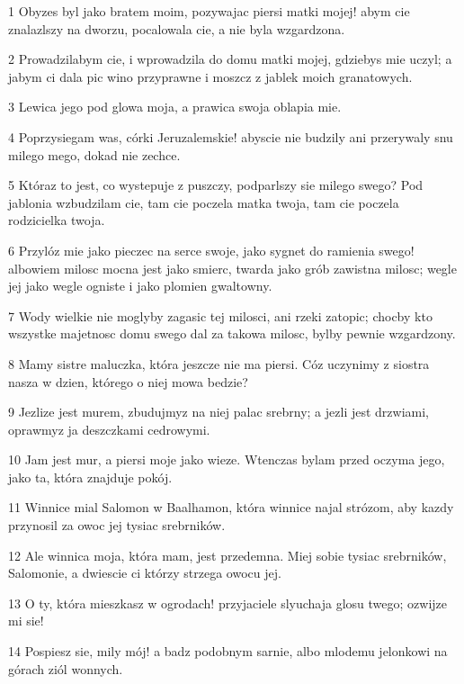 \par 1 Obyzes byl jako bratem moim, pozywajac piersi matki mojej! abym cie znalazlszy na dworzu, pocalowala cie, a nie byla wzgardzona.
\par 2 Prowadzilabym cie, i wprowadzila do domu matki mojej, gdziebys mie uczyl; a jabym ci dala pic wino przyprawne i moszcz z jablek moich granatowych.
\par 3 Lewica jego pod glowa moja, a prawica swoja oblapia mie.
\par 4 Poprzysiegam was, córki Jeruzalemskie! abyscie nie budzily ani przerywaly snu milego mego, dokad nie zechce.
\par 5 Któraz to jest, co wystepuje z puszczy, podparlszy sie milego swego? Pod jablonia wzbudzilam cie, tam cie poczela matka twoja, tam cie poczela rodzicielka twoja.
\par 6 Przylóz mie jako pieczec na serce swoje, jako sygnet do ramienia swego! albowiem milosc mocna jest jako smierc, twarda jako grób zawistna milosc; wegle jej jako wegle ogniste i jako plomien gwaltowny.
\par 7 Wody wielkie nie moglyby zagasic tej milosci, ani rzeki zatopic; chocby kto wszystke majetnosc domu swego dal za takowa milosc, bylby pewnie wzgardzony.
\par 8 Mamy sistre maluczka, która jeszcze nie ma piersi. Cóz uczynimy z siostra nasza w dzien, którego o niej mowa bedzie?
\par 9 Jezlize jest murem, zbudujmyz na niej palac srebrny; a jezli jest drzwiami, oprawmyz ja deszczkami cedrowymi.
\par 10 Jam jest mur, a piersi moje jako wieze. Wtenczas bylam przed oczyma jego, jako ta, która znajduje pokój.
\par 11 Winnice mial Salomon w Baalhamon, która winnice najal strózom, aby kazdy przynosil za owoc jej tysiac srebrników.
\par 12 Ale winnica moja, która mam, jest przedemna. Miej sobie tysiac srebrników, Salomonie, a dwiescie ci którzy strzega owocu jej.
\par 13 O ty, która mieszkasz w ogrodach! przyjaciele slyuchaja glosu twego; ozwijze mi sie!
\par 14 Pospiesz sie, mily mój! a badz podobnym sarnie, albo mlodemu jelonkowi na górach ziól wonnych.


